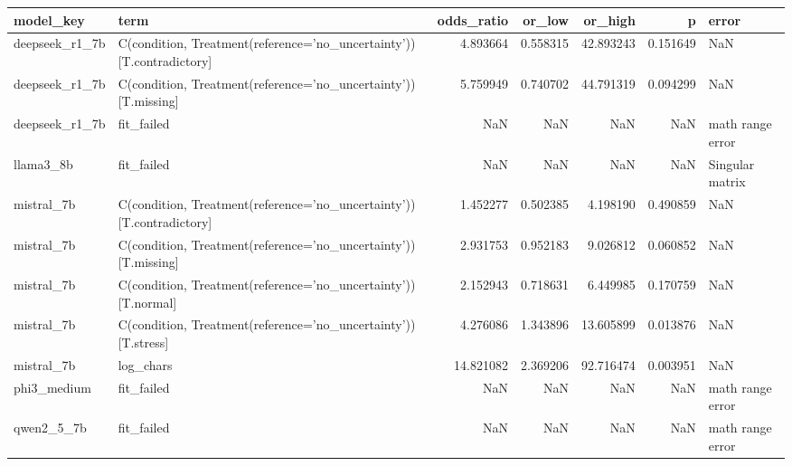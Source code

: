 \begin{tabular}{llrrrrl}
\toprule
model\_key & term & odds\_ratio & or\_low & or\_high & p & error \\
\midrule
deepseek\_r1\_7b & C(condition, Treatment(reference='no\_uncertainty'))[T.contradictory] & 4.893664 & 0.558315 & 42.893243 & 0.151649 & NaN \\
deepseek\_r1\_7b & C(condition, Treatment(reference='no\_uncertainty'))[T.missing] & 5.759949 & 0.740702 & 44.791319 & 0.094299 & NaN \\
deepseek\_r1\_7b & fit\_failed & NaN & NaN & NaN & NaN & math range error \\
llama3\_8b & fit\_failed & NaN & NaN & NaN & NaN & Singular matrix \\
mistral\_7b & C(condition, Treatment(reference='no\_uncertainty'))[T.contradictory] & 1.452277 & 0.502385 & 4.198190 & 0.490859 & NaN \\
mistral\_7b & C(condition, Treatment(reference='no\_uncertainty'))[T.missing] & 2.931753 & 0.952183 & 9.026812 & 0.060852 & NaN \\
mistral\_7b & C(condition, Treatment(reference='no\_uncertainty'))[T.normal] & 2.152943 & 0.718631 & 6.449985 & 0.170759 & NaN \\
mistral\_7b & C(condition, Treatment(reference='no\_uncertainty'))[T.stress] & 4.276086 & 1.343896 & 13.605899 & 0.013876 & NaN \\
mistral\_7b & log\_chars & 14.821082 & 2.369206 & 92.716474 & 0.003951 & NaN \\
phi3\_medium & fit\_failed & NaN & NaN & NaN & NaN & math range error \\
qwen2\_5\_7b & fit\_failed & NaN & NaN & NaN & NaN & math range error \\
\bottomrule
\end{tabular}
